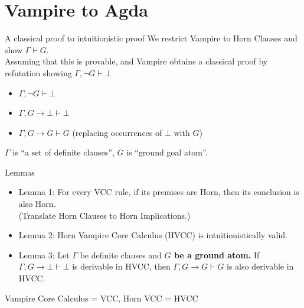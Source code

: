 \documentclass[aspectratio=43]{beamer}
\begin{document}
\section{Vampire to Agda}
\begin{frame}{A classical proof to intuitionistic proof}
    We restrict Vampire to Horn Clauses and show $\Gamma \vdash G$. \\
    Assuming that this is provable, and Vampire obtains a classical proof by refutation showing $\Gamma, \neg G \vdash \bot$
    \begin{itemize}
        \item $\Gamma, \neg G \vdash \bot$ 
        \item $\Gamma, G \rightarrow \bot \vdash \bot$ 
        \item $\Gamma, G \rightarrow G \vdash G$ (replacing occurrences of $\bot$ with $G$)
    \end{itemize}
    \vfill
    {\footnotesize $\Gamma$ is ``a set of definite clauses'', $G$ is ``ground goal atom''. \\}
\end{frame}

\begin{frame}{Lemmas}
    \begin{itemize}
        \item Lemma 1: For every VCC rule, if its premises are Horn, then its conclusion is also Horn. \\
        (Translate Horn Clauses to Horn Implications.)
        \item Lemma 2: Horn Vampire Core Calculus (HVCC) is intuitionistically valid. \\
        \item Lemma 3: Let $\Gamma$ be definite clauses and \textbf{$G$ be a ground atom.}
        If $\Gamma, G \rightarrow \bot \vdash \bot$ is derivable in HVCC, then $\Gamma, G \rightarrow G \vdash G$ is also derivable in HVCC.
    \end{itemize}
    \vfill
    {\footnotesize Vampire Core Calculus = VCC, Horn VCC = HVCC \\}
\end{frame}
\end{document}
